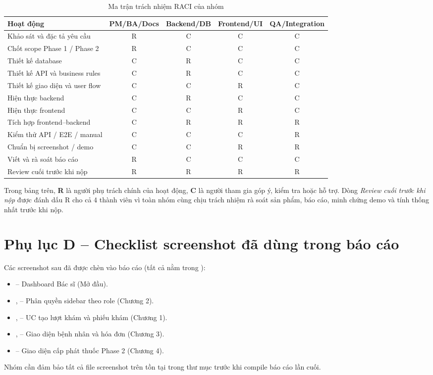 \begin{longtable}{|p{4.2cm}|c|c|c|c|}
\caption{Ma trận trách nhiệm RACI của nhóm}\\
\hline
\textbf{Hoạt động} & \textbf{PM/BA/Docs} & \textbf{Backend/DB} & \textbf{Frontend/UI} & \textbf{QA/Integration} \\
\hline
Khảo sát và đặc tả yêu cầu & R & C & C & C \\
\hline
Chốt scope Phase 1 / Phase 2 & R & C & C & C \\
\hline
Thiết kế database & C & R & C & C \\
\hline
Thiết kế API và business rules & C & R & C & C \\
\hline
Thiết kế giao diện và user flow & C & C & R & C \\
\hline
Hiện thực backend & C & R & C & C \\
\hline
Hiện thực frontend & C & C & R & C \\
\hline
Tích hợp frontend--backend & C & R & R & R \\
\hline
Kiểm thử API / E2E / manual & C & C & C & R \\
\hline
Chuẩn bị screenshot / demo & C & C & R & R \\
\hline
Viết và rà soát báo cáo & R & C & C & C \\
\hline
Review cuối trước khi nộp & R & R & R & R \\
\hline
\end{longtable}

Trong bảng trên, \textbf{R} là người phụ trách chính của hoạt động, \textbf{C} là người tham gia góp ý, kiểm tra hoặc hỗ trợ. Dòng \textit{Review cuối trước khi nộp} được đánh dấu R cho cả 4 thành viên vì toàn nhóm cùng chịu trách nhiệm rà soát sản phẩm, báo cáo, minh chứng demo và tính thống nhất trước khi nộp.

\section{Phụ lục D -- Checklist screenshot đã dùng trong báo cáo}

Các screenshot sau đã được chèn vào báo cáo (tất cả nằm trong ):

\begin{itemize}
    \item {} -- Dashboard Bác sĩ (Mở đầu).
    \item {},  -- Phân quyền sidebar theo role (Chương 2).
    \item {},  -- UC tạo lượt khám và phiếu khám (Chương 1).
    \item {},  -- Giao diện bệnh nhân và hóa đơn (Chương 3).
    \item {} -- Giao diện cấp phát thuốc Phase 2 (Chương 4).
\end{itemize}

Nhóm cần đảm bảo tất cả file screenshot trên tồn tại trong thư mục  trước khi compile báo cáo lần cuối.
